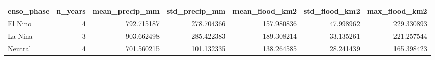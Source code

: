 \begin{tabular}{lrrrrrr}
\toprule
enso\_phase & n\_years & mean\_precip\_mm & std\_precip\_mm & mean\_flood\_km2 & std\_flood\_km2 & max\_flood\_km2 \\
\midrule
El Nino & 4 & 792.715187 & 278.704366 & 157.980836 & 47.998962 & 229.330893 \\
La Nina & 3 & 903.662498 & 285.422383 & 189.308214 & 33.135261 & 221.257544 \\
Neutral & 4 & 701.560215 & 101.132335 & 138.264585 & 28.241439 & 165.398423 \\
\bottomrule
\end{tabular}
